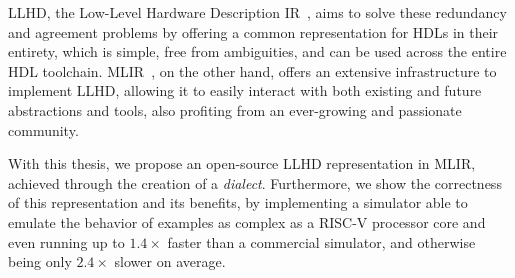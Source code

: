 LLHD, the Low-Level Hardware Description IR~\cite{Schuiki2020}, aims to solve these redundancy and agreement problems by offering a common representation for HDLs in their entirety, which is simple, free from ambiguities, and can be used across the entire HDL toolchain. MLIR~\cite{Lattner2020}, on the other hand, offers an extensive infrastructure to implement LLHD, allowing it to easily interact with both existing and future abstractions and tools, also profiting from an ever-growing and passionate community.

With this thesis, we propose an open-source LLHD representation in MLIR, achieved through the creation of a \textit{dialect}. Furthermore, we show the correctness of this representation and its benefits, by implementing a simulator able to emulate the behavior of examples as complex as a RISC-V processor core and even running up to $1.4\times$ faster than a commercial simulator, and otherwise being only $2.4\times$ slower on average.
